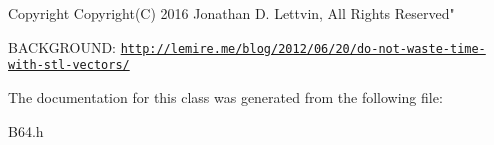 \begin{DoxyCopyright}{Copyright}
Copyright(\+C) 2016 Jonathan D. Lettvin, All Rights Reserved"
\end{DoxyCopyright}
B\+A\+C\+K\+G\+R\+O\+U\+N\+D\+: \href{http://lemire.me/blog/2012/06/20/do-not-waste-time-with-stl-vectors/}{\tt http\+://lemire.\+me/blog/2012/06/20/do-\/not-\/waste-\/time-\/with-\/stl-\/vectors/} 

The documentation for this class was generated from the following file\+:\begin{DoxyCompactItemize}
\item 
B64.\+h\end{DoxyCompactItemize}
